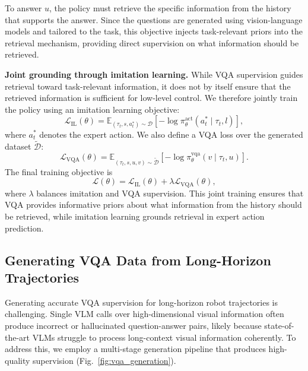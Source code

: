 To answer $u$, the policy must retrieve the specific information from the history that supports the answer.
Since the questions are generated using vision-language models and tailored to the task, this objective injects task-relevant priors into the retrieval mechanism, providing direct supervision on what information should be retrieved.

\vspace{0.5em}
\noindent
\textbf{Joint grounding through imitation learning.}
While VQA supervision guides retrieval toward task-relevant information, it does not by itself ensure that the retrieved information is sufficient for low-level control.
We therefore jointly train the policy using an imitation learning objective:
\begin{equation}
    \mathcal{L}_{\text{IL}}(\theta)
    = \mathbb{E}_{(\tau_t, s, a_t^*) \sim \mathcal{D}}
    \left[-\log \pi_\theta^{\text{act}}(a_t^* \mid \tau_t, l)\right],
\end{equation}
where $a_t^*$ denotes the expert action.
We also define a VQA loss over the generated dataset $\widetilde{\mathcal{D}}$:
\begin{equation}
    \mathcal{L}_{\text{VQA}}(\theta)
    = \mathbb{E}_{(\tau_t, s, u, v) \sim \widetilde{\mathcal{D}}}
    \left[-\log \pi_\theta^{\text{vqa}}(v \mid \tau_t, u)\right].
\end{equation}
The final training objective is
\begin{equation}
    \mathcal{L}(\theta)
    = \mathcal{L}_{\text{IL}}(\theta)
    + \lambda \mathcal{L}_{\text{VQA}}(\theta),
\end{equation}
where $\lambda$ balances imitation and VQA supervision.
This joint training ensures that VQA provides informative priors about what information from the history should be retrieved, while imitation learning grounds retrieval in expert action prediction.

\subsection{Generating VQA Data from Long-Horizon Trajectories}\label{sec:method:vqa-gen}


Generating accurate VQA supervision for long-horizon robot trajectories is challenging. Single VLM calls over high-dimensional visual information often produce incorrect or hallucinated question-answer pairs, likely because state-of-the-art VLMs struggle to process long-context visual information coherently. To address this, we employ a multi-stage generation pipeline that produces high-quality supervision (Fig.~\ref{fig:vqa_generation}).

